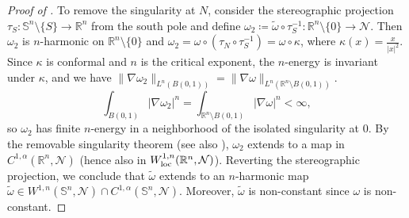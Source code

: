 \documentclass[12pt]{amsart}
\def\n{{\mathcal M}}
\def\n{{\mathcal{M}}}
\def\n{{\mathcal N}}
\def\S{{\mathbb S}}
\newcommand{\loc}{\mathrm{loc}}
\def\loc{{\rm loc}}
\newcommand{\R}{\mathbb{R}}
\numberwithin{theorem}{section} \numberwithin{equation}{section}
\begin{document}
\begin{proof}[Proof of ]
To remove the singularity at $N$, consider the stereographic projection $\tau_S\colon \S^n\setminus\{S\}\to \R^n$ from the south pole and define $\omega_2 \coloneqq \tilde\omega\circ \tau_S^{-1}\colon \R^n\setminus\{0\}\to \n$.
Then $\omega_2$ is $n$-harmonic on $\R^n\setminus\{0\}$ and $
\omega_2=\omega\circ (\tau_N\circ \tau_S^{-1})=\omega\circ \kappa$, where $\kappa(x)=\frac{x}{|x|^2}$.
Since $\kappa$ is conformal and $n$ is the critical exponent, the $n$-energy is invariant under $\kappa$, and we have $\|\nabla \omega_2\|_{L^n(B(0,1))} = \|\nabla \omega\|_{L^n(\R^n\setminus B(0,1))}$.
\[
\int_{B(0,1)} |\nabla \omega_2|^n
= \int_{\R^n\setminus B(0,1)} |\nabla \omega|^n <\infty,
\]
so $\omega_2$ has finite $n$-energy in a neighborhood of the isolated singularity at $0$.
By the removable singularity theorem \cite[Theorem~5.1]{Mou-Yang-1996} (see also \cite{Duzaar-Fuchs}), $\omega_2$ extends to a map in
$C^{1,\alpha}(\R^n,\n)$ (hence also in $W^{1,n}_{\loc}(\R^n,\n)$).
Reverting the stereographic projection, we conclude that $\tilde\omega$ extends to an
$n$-harmonic map $\tilde\omega\in W^{1,n}(\S^n,\n)\cap C^{1,\alpha}(\S^n,\n)$.
Moreover, $\tilde\omega$ is non-constant since $\omega$ is non-constant.
\end{proof}

%
%
\end{document}
